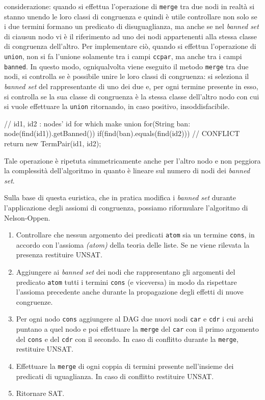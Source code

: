 \documentclass[a4paper,11pt]{article}
\begin{document}
considerazione: quando si effettua l'operazione di \texttt{merge} tra 
due nodi in realtà si stanno unendo le loro classi di congruenza e quindi 
è utile controllare non solo se i due termini formano un predicato di 
disuguaglianza, ma anche se nel \emph{banned set} di ciausun nodo vi è il 
riferimento ad uno dei nodi appartenenti alla stessa classe di congruenza 
dell'altro. Per implementare ciò, quando si effettua l'operazione di 
\texttt{union}, non si fa l'unione solamente tra i campi \texttt{ccpar}, 
ma anche tra i campi \texttt{banned}. In questo modo, ogniqualvolta 
viene eseguito il metodo \texttt{merge} tra due nodi, si controlla se è possibile 
unire le loro classi di congruenza: si seleziona il \emph{banned set} 
del rappresentante di uno dei due e, per ogni termine presente in 
esso, si controlla se la sua classe di congruenza è la stessa classe dell'altro 
nodo con cui si vuole effettuare la \texttt{union} ritornando, in caso 
positivo, insoddisfacibile.
\begin{java}
// id1, id2 : nodes' id for which make union
for(String ban: node(find(id1)).getBanned())
		if(find(ban).equals(find(id2))) // CONFLICT
			return new TermPair(id1, id2);
\end{java}
Tale operazione è ripetuta simmetricamente anche per l'altro nodo e 
non peggiora la complessità dell'algoritmo in quanto è lineare sul numero
di nodi dei \emph{banned set}.\par 
Sulla base di questa euristica, che in pratica modifica i \emph{banned set} 
durante l'applicazione degli assiomi di congruenza, possiamo riformulare 
l'algoritmo di Nelson-Oppen.
\begin{enumerate}
\item Controllare che nessun argomento dei predicati \texttt{atom} sia un 
termine \texttt{cons}, in accordo con l'assioma \emph{(atom)} della teoria
delle liste. Se ne viene rilevata la presenza restituire UNSAT.
\item Aggiungere ai \emph{banned set} dei nodi che rappresentano gli 
argomenti del predicato \texttt{atom} tutti i termini \texttt{cons} (e 
viceversa) in modo da rispettare l'assioma precedente anche durante 
la propagazione degli effetti di nuove congruenze.
\item Per ogni nodo \texttt{cons} aggiungere al DAG due nuovi nodi 
\texttt{car} e \texttt{cdr} i cui archi puntano a quel nodo e 
poi effettuare la \texttt{merge} del \texttt{car} con il primo argomento 
del \texttt{cons} e del \texttt{cdr} con il secondo. In caso di conflitto
durante la \texttt{merge}, restituire UNSAT.
\item Effettuare la \texttt{merge} di ogni coppia di termini presente 
nell'insieme dei predicati di uguaglianza. In caso di conflitto restituire 
UNSAT. 
\item Ritornare SAT.
\end{enumerate}
\end{document}
